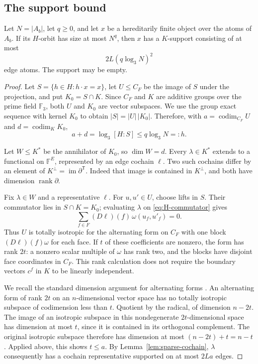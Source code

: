 \subsection{The support bound}

\begin{proposition}\label{prop:small-orbit-support}
Let $N=|A_b|$, let $q\ge0$, and let $x$ be a hereditarily finite object
over the atoms of $A_b$. If its $H$-orbit has size at most $N^q$, then
$x$ has a $K$-support consisting of at most
\[
 2L(q\log_3 N)^2
\]
edge atoms. The support may be empty.
\end{proposition}
\begin{proof}
Let $S=\{h\in H:h\cdot x=x\}$, let $U\le C_F$ be the image of $S$
under the projection, and put $K_0=S\cap K$. Since $C_F$ and $K$ are
additive groups over the prime field $\mathbb F_3$, both $U$ and $K_0$
are vector subspaces. We use the group exact sequence with kernel $K_0$ to obtain
$|S|=|U|\,|K_0|$. Therefore, with
$a=\operatorname{codim}_{C_F}U$ and $d=\operatorname{codim}_K K_0$,
\begin{equation}\label{eq:stabilizer-codimension}
 a+d=\log_3[H:S]\le q\log_3 N=:h.
\end{equation}

Let $W\le K^*$ be the annihilator of $K_0$, so $\dim W=d$. Every
$\lambda\in K^*$ extends to a functional on $\mathbb F^E$, represented
by an edge cochain $\ell$. Two such cochains differ by an element of
$K^\perp=\operatorname{im}\partial^{\mathsf T}$. Indeed that image is
contained in $K^\perp$, and both have dimension $\operatorname{rank}\partial$.

Fix $\lambda\in W$ and a representative $\ell$. For $u,u'\in U$,
choose lifts in $S$. Their commutator lies in $S\cap K=K_0$; evaluating
$\lambda$ on \eqref{eq:H-commutator} gives
\[
 \sum_{f\in F}(D\ell)(f)\,\omega(u_f,u'_f)=0.
\]
Thus $U$ is totally isotropic for the alternating form on $C_F$ with
one block $(D\ell)(f)\omega$ for each face. If $t$ of these coefficients
are nonzero, the form has rank $2t$: a nonzero scalar multiple of
$\omega$ has rank two, and the blocks have disjoint face coordinates
in $C_F$. This rank calculation does not require the boundary vectors
$c^f$ in $K$ to be linearly independent.

We recall the standard dimension argument for alternating forms
\cite[Sections~3.1 and~3.3]{cameron2000classical}.
An alternating form of rank $2t$ on an
$n$-dimensional vector space has no totally isotropic subspace of
codimension less than $t$. Quotient by the radical, of dimension
$n-2t$. The image of an isotropic subspace in this nondegenerate
$2t$-dimensional space has dimension at most $t$, since it is contained
in its orthogonal complement. The original isotropic subspace therefore
has dimension at most $(n-2t)+t=n-t$. Applied above, this shows $t\le a$.
By Lemma~\ref{lem:sparse-cochain}, $\lambda$ consequently has a cochain
representative supported on at most $2La$ edges.


\end{proof}
